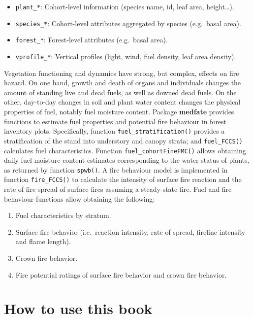 \documentclass[]{book}
\providecommand{\tightlist}{%
  \setlength{\itemsep}{0pt}\setlength{\parskip}{0pt}}
\begin{document}
\begin{itemize}
\tightlist
\item
  \texttt{plant\_*}: Cohort-level information (species name, id, leaf area, height\ldots{}).
\item
  \texttt{species\_*}: Cohort-level attributes aggregated by species (e.g.~basal area).
\item
  \texttt{forest\_*}: Forest-level attributes (e.g.~basal area).
\item
  \texttt{vprofile\_*}: Vertical profiles (light, wind, fuel density, leaf area density).
\end{itemize}

Vegetation functioning and dynamics have strong, but complex, effects on fire hazard. On one hand, growth and death of organs and individuals changes the amount of standing live and dead fuels, as well as downed dead fuels. On the other, day-to-day changes in soil and plant water content changes the physical properties of fuel, notably fuel moisture content. Package \textbf{medfate} provides functions to estimate fuel properties and potential fire behaviour in forest inventory plots. Specifically, function \texttt{fuel\_stratification()} provides a stratification of the stand into understory and canopy strata; and \texttt{fuel\_FCCS()} calculates fuel characteristics. Function \texttt{fuel\_cohortFineFMC()} allows obtaining daily fuel moisture content estimates corresponding to the water status of plants, as returned by function \texttt{spwb()}. A fire behaviour model is implemented in function \texttt{fire\_FCCS()} to calculate the intensity of surface fire reaction and the rate of fire spread of surface fires assuming a steady-state fire. Fuel and fire behaviour functions allow obtaining the following:

\begin{enumerate}
\def\labelenumi{\arabic{enumi}.}
\tightlist
\item
  Fuel characteristics by stratum.
\item
  Surface fire behavior (i.e.~reaction intensity, rate of spread, fireline intensity and flame length).
\item
  Crown fire behavior.
\item
  Fire potential ratings of surface fire behavior and crown fire behavior.
\end{enumerate}

\hypertarget{how-to-use-this-book}{%
\section{How to use this book}\label{how-to-use-this-book}}
\end{document}
